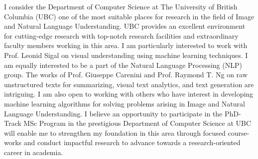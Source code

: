 \documentclass[12pt]{article}
\begin{document}
I consider the Department of Computer Science at The University of British Columbia (UBC) one of the most suitable places for research in the field of Image and Natural Language Understanding. UBC provides an excellent environment for cutting-edge research with top-notch research facilities and extraordinary faculty members working in this area. I am particularly interested to work with Prof. Leonid Sigal on visual understanding using machine learning techniques. I am equally interested to be a part of the Natural Language Processing (NLP) group. The works of Prof. Giuseppe Carenini and Prof. Raymond T. Ng on raw unstructured texts for summarizing, visual text analytics, and text generation are intriguing. I am also open to working with others who have interest in developing machine learning algorithms for solving problems arising in Image and Natural Language Understanding. I believe an opportunity to participate in the PhD-Track MSc Program in the prestigious Department of Computer Science at UBC will enable me to strengthen my foundation in this area through focused course-works and conduct impactful research to advance towards a research-oriented career in academia. 
\end{document}
